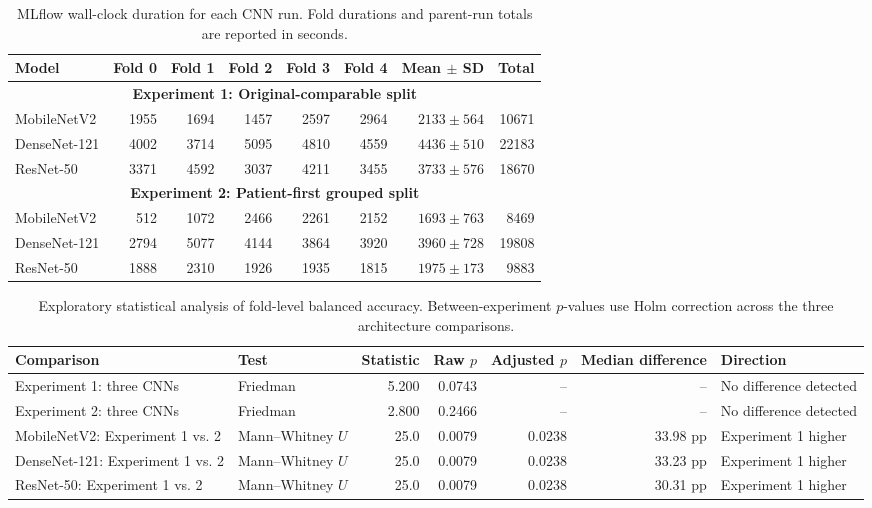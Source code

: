 \begin{table}[t]
\caption{MLflow wall-clock duration for each CNN run. Fold durations and parent-run totals are reported in seconds.}
\label{tab:cnn-execution-time}
\centering
\scriptsize
\begin{tabular}{@{}lrrrrrrr@{}}
\toprule
Model & Fold 0 & Fold 1 & Fold 2 & Fold 3 & Fold 4 & Mean $\pm$ SD & Total \\
\midrule
\multicolumn{8}{c}{\textbf{Experiment 1: Original-comparable split}} \\
\midrule
MobileNetV2 & 1955 & 1694 & 1457 & 2597 & 2964 & $2133 \pm 564$ & 10671 \\
DenseNet-121 & 4002 & 3714 & 5095 & 4810 & 4559 & $4436 \pm 510$ & 22183 \\
ResNet-50 & 3371 & 4592 & 3037 & 4211 & 3455 & $3733 \pm 576$ & 18670 \\
\midrule
\multicolumn{8}{c}{\textbf{Experiment 2: Patient-first grouped split}} \\
\midrule
MobileNetV2 & 512 & 1072 & 2466 & 2261 & 2152 & $1693 \pm 763$ & 8469 \\
DenseNet-121 & 2794 & 5077 & 4144 & 3864 & 3920 & $3960 \pm 728$ & 19808 \\
ResNet-50 & 1888 & 2310 & 1926 & 1935 & 1815 & $1975 \pm 173$ & 9883 \\
\bottomrule
\end{tabular}
\end{table}

\begin{table}[t]
\caption{Exploratory statistical analysis of fold-level balanced accuracy. Between-experiment $p$-values use Holm correction across the three architecture comparisons.}
\label{tab:bcc-statistical-analysis}
\centering
\small
\begin{tabularx}{\textwidth}{@{}XlrrrrX@{}}
\toprule
Comparison & Test & Statistic & Raw $p$ & Adjusted $p$ & Median difference & Direction \\
\midrule
Experiment 1: three CNNs & Friedman & 5.200 & 0.0743 & -- & -- & No difference detected \\
Experiment 2: three CNNs & Friedman & 2.800 & 0.2466 & -- & -- & No difference detected \\
\midrule
MobileNetV2: Experiment 1 vs. 2 & Mann--Whitney $U$ & 25.0 & 0.0079 & 0.0238 & 33.98 pp & Experiment 1 higher \\
DenseNet-121: Experiment 1 vs. 2 & Mann--Whitney $U$ & 25.0 & 0.0079 & 0.0238 & 33.23 pp & Experiment 1 higher \\
ResNet-50: Experiment 1 vs. 2 & Mann--Whitney $U$ & 25.0 & 0.0079 & 0.0238 & 30.31 pp & Experiment 1 higher \\
\bottomrule
\end{tabularx}
\end{table}

